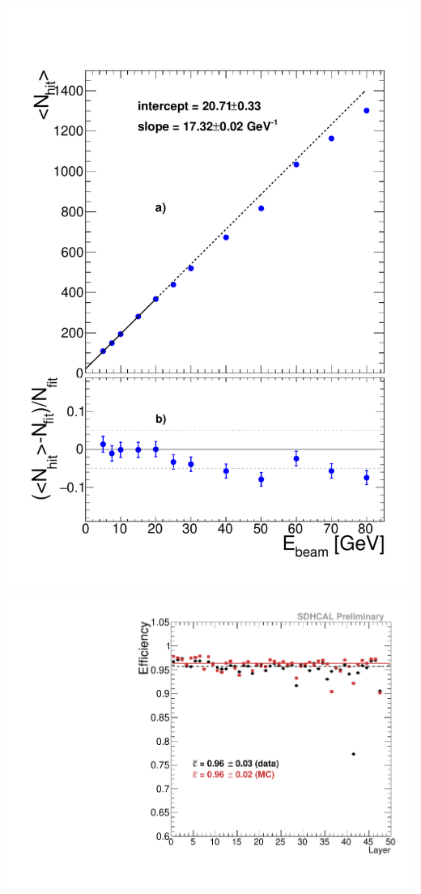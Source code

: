 \documentclass[8pt]{beamer}
\begin{document}
  \begin{frame}
  \frametitle{\secname}
  \framesubtitle{\subsecname}
    \begin{minipage}{0.5\linewidth}
      \includegraphics[width=1\linewidth]{figs/NHITPION.pdf}
    \end{minipage} \hfill
    \begin{minipage}{0.48\linewidth}
      \begin{center}
        \includegraphics[width=0.7\linewidth]{figs/effLayer.pdf} \\

\end{center}
\end{minipage}
\end{frame}
\end{document}

